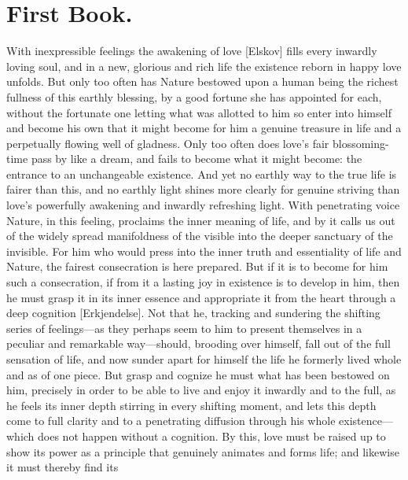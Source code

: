 \documentclass[12pt,a4paper]{book}
\begin{document}
\chapter*{First Book.}

With inexpressible feelings the awakening of love [Elskov] fills every
inwardly loving soul, and in a new, glorious and rich life the existence
reborn in happy love unfolds. But only too often has Nature bestowed upon
a human being the richest fullness of this earthly blessing, by a good
fortune she has appointed for each, without the fortunate one letting
what was allotted to him so enter into himself and become his own that it
might become for him a genuine treasure in life and a perpetually flowing
well of gladness. Only too often does love's fair blossoming-time pass by
like a dream, and fails to become what it might become: the entrance to an
unchangeable existence. And yet no earthly way to the true life is fairer
than this, and no earthly light shines more clearly for genuine striving
than love's powerfully awakening and inwardly refreshing light. With
penetrating voice Nature, in this feeling, proclaims the inner meaning of
life, and by it calls us out of the widely spread manifoldness of the
visible into the deeper sanctuary of the invisible. For him who would
press into the inner truth and essentiality of life and Nature, the
fairest consecration is here prepared. But if it is to become for him such
a consecration, if from it a lasting joy in existence is to develop in
him, then he must grasp it in its inner essence and appropriate it from
the heart through a deep cognition [Erkjendelse]. Not that he, tracking
and sundering the shifting series of feelings---as they perhaps seem to
him to present themselves in a peculiar and remarkable way---should,
brooding over himself, fall out of the full sensation of life, and now
sunder apart for himself the life he formerly lived whole and as of one
piece. But grasp and cognize he must what has been bestowed on him,
precisely in order to be able to live and enjoy it inwardly and to the
full, as he feels its inner depth stirring in every shifting moment, and
lets this depth come to full clarity and to a penetrating diffusion
through his whole existence---which does not happen without a cognition.
By this, love must be raised up to show its power as a principle that
genuinely animates and forms life; and likewise it must thereby find its
\end{document}
